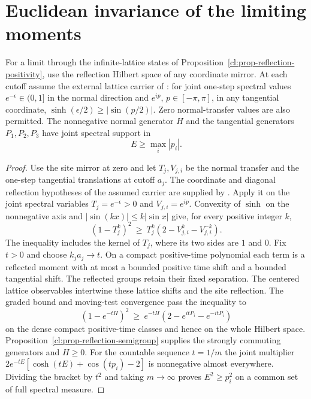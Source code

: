 \documentclass[11pt,letterpaper,reqno]{amsart}
\makeatletter
\numberwithin{equation}{section}
\theoremstyle{definition}
\newcommand{\ms@minorstart}{%
  \pushQED{\qed}\renewcommand{\qedsymbol}{$\blacksquare$}}
\newenvironment{proposition}[1][]{\ms@minorstart\ms@proposition[#1]}
  {\popQED\endms@proposition}
\theoremstyle{remark}
\makeatother
\begin{document}
\section{Euclidean invariance of the limiting moments}
\label{cl:sec-euclidean}

\begin{proposition}[The joint transfer spectrum]
\label{cl:prop-cube-cone}
For a limit through the infinite-lattice states of
Proposition~\ref{cl:prop-reflection-positivity},
use the reflection Hilbert space of any coordinate
mirror. At each cutoff assume the external lattice carrier
of \cite[Uniform lattice plateau estimate and the Euclidean
Hilbert bridge]{Ext}: for joint one-step spectral values
\(e^{-\epsilon}\in(0,1]\) in the normal direction and
\(e^{ip}\), \(p\in[-\pi,\pi]\), in any tangential coordinate,
\(\sinh(\epsilon/2)\ge|\sin(p/2)|\).
Zero normal-transfer values are also permitted.
The nonnegative normal generator \(H\) and
the tangential generators \(P_1,P_2,P_3\) have joint
spectral support in
\begin{equation}\label{cl:eq-cube-cone}
                     E\ge\max_i |p_i|.
\end{equation}
\end{proposition}

\begin{proof}
Use the site mirror at zero and let \(T_j,V_{j,i}\) be
the normal transfer and the one-step tangential translations
at cutoff \(a_j\). The coordinate and diagonal reflection
hypotheses of the assumed carrier are supplied by
\cite[Theorem~B]{LP}. Apply it on the joint spectral
variables \(T_j=e^{-\epsilon}>0\) and \(V_{j,i}=e^{ip}\).
Convexity of \(\sinh\) on the nonnegative axis and
\(|\sin(kx)|\le k|\sin x|\) give, for every positive
integer \(k\),
\[
 (1-T_j^k)^2\ \ge\
          T_j^k(2-V_{j,i}^k-V_{j,i}^{-k}).
\]
The inequality includes the kernel of \(T_j\), where its
two sides are \(1\) and \(0\). Fix \(t>0\) and choose
\(k_j a_j\to t\). On a compact positive-time polynomial
each term is a reflected moment with at most a bounded
positive time shift and a bounded tangential shift.
The reflected groups retain their fixed separation.
The centered lattice observables intertwine these lattice
shifts and the site reflection. The graded bound and
moving-test convergence pass the inequality to
\[
 (1-e^{-tH})^2\ \ge\
       e^{-tH}(2-e^{itP_i}-e^{-itP_i})
\]
on the dense compact positive-time classes and hence on
the whole Hilbert space. Proposition~\ref{cl:prop-reflection-semigroup}
supplies the strongly commuting generators and \(H\ge0\).
For the countable sequence \(t=1/m\) the joint multiplier
\(2e^{-tE}[\cosh(tE)+\cos(tp_i)-2]\) is nonnegative
almost everywhere. Dividing the bracket by \(t^2\)
and taking \(m\to\infty\) proves \(E^2\ge p_i^2\)
on a common set of full spectral measure.
\end{proof}
\end{document}
